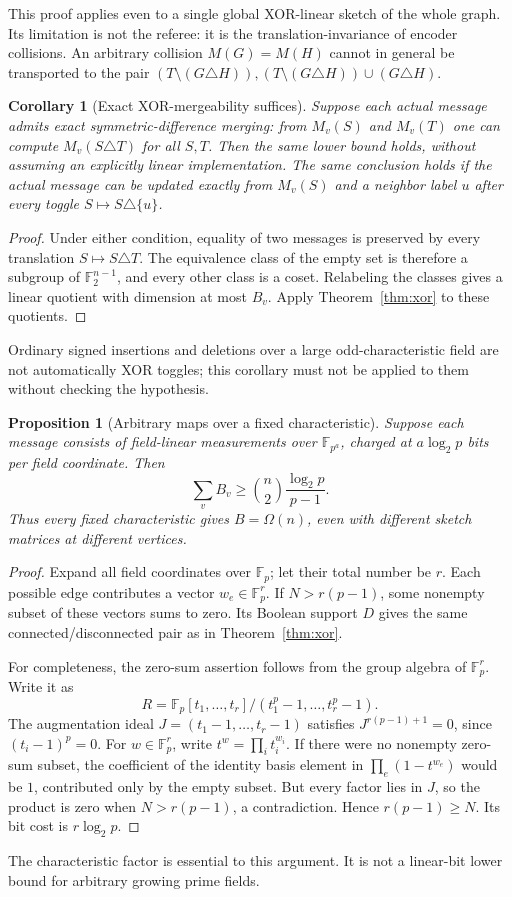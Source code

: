 \documentclass[11pt]{article}
\newtheorem{proposition}[theorem]{Proposition}
\newtheorem{corollary}[theorem]{Corollary}
\theoremstyle{definition}\newtheorem{definition}[theorem]{Definition}
\theoremstyle{remark}\newtheorem{remark}[theorem]{Remark}
\newcommand{\F}{\mathbb F}
\begin{document}
This proof applies even to a single global XOR-linear sketch of the whole graph. Its limitation is not the referee: it is the translation-invariance of encoder collisions. An arbitrary collision $M(G)=M(H)$ cannot in general be transported to the pair $(T\setminus(G\triangle H)),(T\setminus(G\triangle H))\cup(G\triangle H)$.

\begin{corollary}[Exact XOR-mergeability suffices]
Suppose each actual message admits exact symmetric-difference merging: from $M_v(S)$ and $M_v(T)$ one can compute $M_v(S\triangle T)$ for all $S,T$. Then the same lower bound holds, without assuming an explicitly linear implementation. The same conclusion holds if the actual message can be updated exactly from $M_v(S)$ and a neighbor label $u$ after every toggle $S\mapsto S\triangle\{u\}$.
\end{corollary}
\begin{proof}
Under either condition, equality of two messages is preserved by every translation $S\mapsto S\triangle T$. The equivalence class of the empty set is therefore a subgroup of $\F_2^{n-1}$, and every other class is a coset. Relabeling the classes gives a linear quotient with dimension at most $B_v$. Apply Theorem~\ref{thm:xor} to these quotients.
\end{proof}
Ordinary signed insertions and deletions over a large odd-characteristic field are not automatically XOR toggles; this corollary must not be applied to them without checking the hypothesis.

\begin{proposition}[Arbitrary maps over a fixed characteristic]\label{prop:fixedchar}
Suppose each message consists of field-linear measurements over $\F_{p^a}$, charged at $a\log_2p$ bits per field coordinate. Then
\[
 \sum_v B_v\ge \binom n2\frac{\log_2p}{p-1}.
\]
Thus every fixed characteristic gives $B=\Omega(n)$, even with different sketch matrices at different vertices.
\end{proposition}
\begin{proof}
Expand all field coordinates over $\F_p$; let their total number be $r$. Each possible edge contributes a vector $w_e\in\F_p^r$. If $N>r(p-1)$, some nonempty subset of these vectors sums to zero. Its Boolean support $D$ gives the same connected/disconnected pair as in Theorem~\ref{thm:xor}.

For completeness, the zero-sum assertion follows from the group algebra of $\F_p^r$. Write it as
\[
 R=\F_p[t_1,\ldots,t_r]/(t_1^p-1,\ldots,t_r^p-1).
\]
The augmentation ideal $J=(t_1-1,\ldots,t_r-1)$ satisfies $J^{r(p-1)+1}=0$, since $(t_i-1)^p=0$. For $w\in\F_p^r$, write $t^w=\prod_i t_i^{w_i}$. If there were no nonempty zero-sum subset, the coefficient of the identity basis element in $\prod_e(1-t^{w_e})$ would be $1$, contributed only by the empty subset. But every factor lies in $J$, so the product is zero when $N>r(p-1)$, a contradiction. Hence $r(p-1)\ge N$. Its bit cost is $r\log_2p$.
\end{proof}
The characteristic factor is essential to this argument. It is not a linear-bit lower bound for arbitrary growing prime fields.
\end{document}
